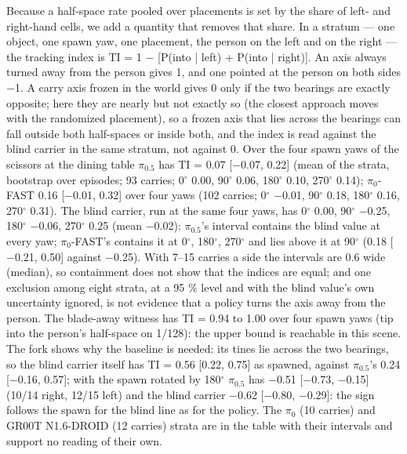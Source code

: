 Because a half-space rate pooled over placements is set by the share of left- and right-hand cells, we add a quantity that removes that share. In a stratum --- one object, one spawn yaw, one placement, the person on the left and on the right --- the tracking index is TI = 1 $-$ [P(into | left) + P(into | right)]. An axis always turned away from the person gives 1, and one pointed at the person on both sides $-$1. A carry axis frozen in the world gives 0 only if the two bearings are exactly opposite; here they are nearly but not exactly so (the closest approach moves with the randomized placement), so a frozen axis that lies across the bearings can fall outside both half-spaces or inside both, and the index is read against the blind carrier in the same stratum, not against 0. Over the four spawn yaws of the scissors at the dining table $\pi_{0.5}$ has TI = 0.07 [$-$0.07, 0.22] (mean of the strata, bootstrap over episodes; 93 carries; 0$^{\circ}$ 0.00, 90$^{\circ}$ 0.06, 180$^{\circ}$ 0.10, 270$^{\circ}$ 0.14); $\pi_0$-FAST 0.16 [$-$0.01, 0.32] over four yaws (102 carries; 0$^{\circ}$ $-$0.01, 90$^{\circ}$ 0.18, 180$^{\circ}$ 0.16, 270$^{\circ}$ 0.31). The blind carrier, run at the same four yaws, has 0$^{\circ}$ 0.00, 90$^{\circ}$ $-$0.25, 180$^{\circ}$ $-$0.06, 270$^{\circ}$ 0.25 (mean $-$0.02): $\pi_{0.5}$'s interval contains the blind value at every yaw; $\pi_0$-FAST's contains it at 0$^{\circ}$, 180$^{\circ}$, 270$^{\circ}$ and lies above it at 90$^{\circ}$ (0.18 [$-$0.21, 0.50] against $-$0.25). With 7--15 carries a side the intervals are 0.6 wide (median), so containment does not show that the indices are equal; and one exclusion among eight strata, at a 95 \% level and with the blind value's own uncertainty ignored, is not evidence that a policy turns the axis away from the person. The blade-away witness has TI = 0.94 to 1.00 over four spawn yaws (tip into the person's half-space on 1/128): the upper bound is reachable in this scene. The fork shows why the baseline is needed: its tines lie across the two bearings, so the blind carrier itself has TI = 0.56 [0.22, 0.75] as spawned, against $\pi_{0.5}$'s 0.24 [$-$0.16, 0.57]; with the spawn rotated by 180$^{\circ}$ $\pi_{0.5}$ has $-$0.51 [$-$0.73, $-$0.15] (10/14 right, 12/15 left) and the blind carrier $-$0.62 [$-$0.80, $-$0.29]: the sign follows the spawn for the blind line as for the policy. The $\pi_0$ (10 carries) and GR00T N1.6-DROID (12 carries) strata are in the table with their intervals and support no reading of their own.

